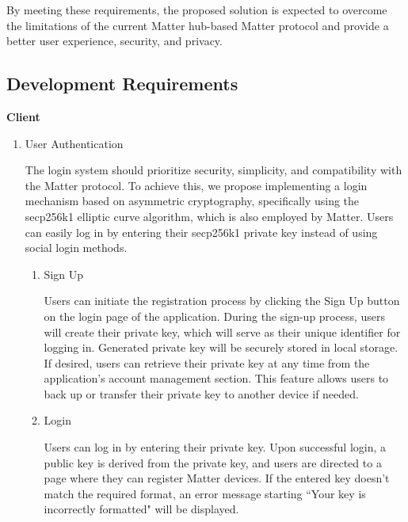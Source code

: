 \documentclass[conference]{IEEEtran}
\begin{document}
By meeting these requirements, the proposed solution is expected to overcome
the limitations of the current Matter hub-based Matter protocol and provide
a better user experience, security, and privacy.

\subsection{Development Requirements}
{\centering \textbf{Client} \par}
\begin{enumerate}[itemsep=2ex, parsep=1ex]
	\item User Authentication
	      	      	      
	      The login system should prioritize security, simplicity, and compatibility
	      with the Matter protocol. To achieve this, we propose implementing a login
	      mechanism based on asymmetric cryptography, specifically using the secp256k1
	      elliptic curve algorithm, which is also employed by Matter. Users can easily
	      log in by entering their secp256k1 private key instead of using social login
	      methods.
	      	      	      
	      \begin{enumerate}[itemsep=2ex, parsep=1ex]
	      	\item Sign Up
	      	      	      	      	      	      
	      	      Users can initiate the registration process by clicking the Sign Up
	      	      button on the login page of the application. During the sign-up process,
	      	      users will create their private key, which will serve as their unique identifier
	      	      for logging in. Generated private key will be securely stored in local
	      	      storage. If desired, users can retrieve their private key at any time
	      	      from the application's account management section. This feature allows
	      	      users to back up or transfer their private key to another device if needed.
	      	      	      	      	      	      
	      	\item Login
	      	      	      	      	      	      
	      	      Users can log in by entering their private key. Upon successful login,
	      	      a public key is derived from the private key, and users are directed to
	      	      a page where they can register Matter devices. If the entered key
	      	      doesn't match the required format, an error message starting ``Your key
	      	      is incorrectly formatted" will be displayed.
	      \end{enumerate}
	      	      	      

\end{enumerate}
\end{document}

